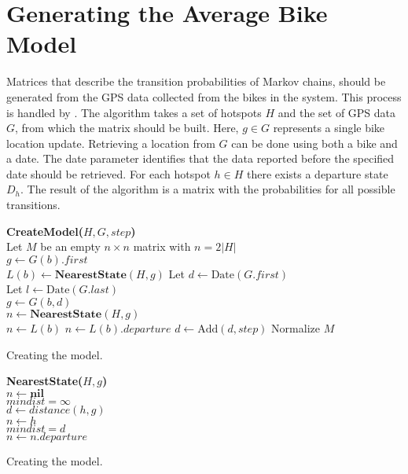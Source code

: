 \section{Generating the Average Bike Model} \label{markov:create_model}
Matrices that describe the transition probabilities of Markov chains, should be generated from the GPS data collected from the bikes in the system.
This process is handled by .
The algorithm takes a set of hotspots $H$ and the set of GPS data $G$, from which the matrix should be built.
Here, $g \in G$ represents a single bike location update.
Retrieving a location from $G$ can be done using both a bike and a date.
The date parameter identifies that the data reported before the specified date should be retrieved.
For each hotspot $h \in H$ there exists a departure state $D_h$.
The result of the algorithm is a matrix with the probabilities for all possible transitions.

\begin{algorithm}
\SetAlgoNoEnd
\textbf{CreateModel($H, G, step$)}\\
Let $M$ be an empty $n \times n$ matrix with $n = 2|H|$ \\
	{
	$g \leftarrow G(b).first$\\
	$L(b) \leftarrow
	 \textbf{NearestState}(H, g)$
	}
Let $d \leftarrow \text{Date}(G.first)$\\
Let $l \leftarrow \text{Date}(G.last)$\\
	{
		{
		$g \leftarrow G(b, d)$\\
		$n \leftarrow \textbf{NearestState}(H, g)$\\
			{
			$n \leftarrow L(b)$
			}
			{
			$n \leftarrow L(b).departure$
			}
		}
	$d \leftarrow \text{Add}(d, step)$
	}
Normalize $M$\\
\caption{Creating the model.}
\label{markov:alg:create_model}
\end{algorithm}

\begin{algorithm}
\SetAlgoNoEnd
\textbf{NearestState($H, g$)}\\
$n \leftarrow \textbf{nil}$\\
$mindist = \infty$\\
	{
	$d \leftarrow distance(h, g)$\\
		{
		$n \leftarrow h$\\
		$mindist = d$\\
		}
	}
	{
	$n \leftarrow n.departure$
	}
\caption{Creating the model.}
\label{markov:alg:nearest}
\end{algorithm}